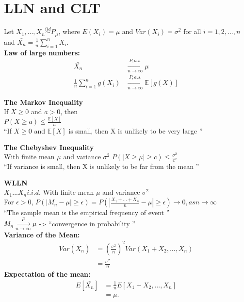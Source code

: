 \section{LLN and CLT}
Let $X_1, ..., X_n \stackrel{iid}{\sim} P_{\mu}$, where $E(X_i)=\mu$ and $Var(X_i)=\sigma^2$ for all $i=1,2,...,n$ and $\bar{X_n}= \frac{1}{n} \sum_{i=1}^{n} X_i$.\\
\textbf{Law of large numbers:}
\begin{align*}
\bar{X_n}& \xrightarrow[n \rightarrow \infty]{P, a.s.} \mu\\
\frac{1}{n} \sum_{i=1}^{n} g(X_i)& \xrightarrow[n \rightarrow \infty]{P, a.s.} \mathbb{E}[g(X)]
\end{align*}

\textbf{The Markov Inequality} \\
If $X\geq 0$ and $a > 0$, then \\

$P(X \geq a) \leq \frac{\mathbb{E}[X]}{a}$ \\

\textquotedblleft If $X \geq 0$ and $\mathbb{E}[X]$ is small, then X is unlikely to be very large \textquotedblright

\textbf{The Chebyshev Inequality} \\
With finite mean $\mu$ and variance $\sigma^2$
$P(|X \geq \mu| \geq c) \leq \frac{\sigma^2}{c^2}$ \\
\textquotedblleft If variance is small, then X is unlikely to be far from the mean \textquotedblright

\textbf{WLLN} \\
$X_{1}...X_{n} i.i.d$. With finite mean $\mu$ and variance $\sigma^2$ \\
For $\epsilon > 0$, $P(|M_{n}-\mu| \geq \epsilon) = P (|\frac{X_{1}+...+X_{n}}{n} -\mu| \geq \epsilon) \rightarrow 0, as n \rightarrow \infty $ \\
\textquotedblleft The sample mean is the empirical frequency of event \textquotedblright \\
$M_{n} \xrightarrow[n \rightarrow \infty]{P} \mu$ -> \textquotedblleft convergence in probability \textquotedblright \\

\textbf{Variance of the Mean:}
\begin{align*}
Var(\overline{X_n})&=(\frac{\sigma^2}{n})^2 Var(X_1 + X_2,...,X_n)\\
& =\frac{\sigma^2}{n}
\end{align*}
\textbf{Expectation of the mean:}
\begin{align*}
E[\bar{X_n}] & =\frac{1}{n}E[X_1 + X_2,...,X_n]\\
&=\mu.
\end{align*}
